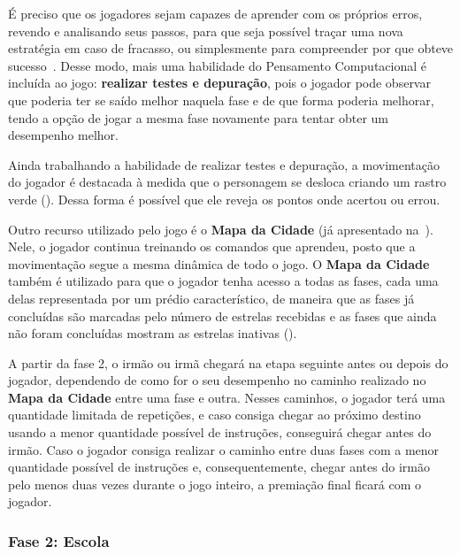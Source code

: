 É preciso que os jogadores sejam capazes de aprender com os próprios erros, revendo e analisando seus passos, para que seja possível traçar uma nova estratégia em caso de fracasso, ou simplesmente para compreender por que obteve sucesso~\cite{paula_jogos_2016}. Desse modo, mais uma habilidade do Pensamento Computacional é incluída ao jogo: \textbf{realizar testes e depuração}, pois o jogador pode observar que poderia ter se saído melhor naquela fase e de que forma poderia melhorar, tendo a opção de jogar a mesma fase novamente para tentar obter um desempenho melhor.

Ainda trabalhando a habilidade de realizar testes e depuração, a movimentação do jogador é destacada à medida que o personagem se desloca criando um rastro verde (). Dessa forma é possível que ele reveja os pontos onde acertou ou errou.


Outro recurso utilizado pelo jogo é o  \textbf{Mapa da Cidade} (já apresentado na~). Nele, o jogador continua treinando os comandos que aprendeu, posto que a movimentação segue a mesma dinâmica de todo o jogo. O  \textbf{Mapa da Cidade} também é utilizado para que o jogador tenha acesso a todas as fases, cada uma delas representada por um prédio característico, de maneira que as fases já concluídas são marcadas pelo número de estrelas recebidas e as fases que ainda não foram concluídas mostram as estrelas inativas ().


A partir da fase 2, o irmão ou irmã chegará na etapa seguinte antes ou depois do jogador, dependendo de como for o seu desempenho no caminho realizado no \textbf{Mapa da Cidade} entre uma fase e outra. Nesses caminhos, o jogador terá uma quantidade limitada de repetições, e caso consiga chegar ao próximo destino usando a menor quantidade possível de instruções,  conseguirá chegar antes do irmão. Caso o jogador consiga realizar o caminho entre duas fases com a menor quantidade possível de instruções e, consequentemente, chegar antes do irmão pelo menos duas vezes durante o jogo inteiro, a premiação final ficará com o jogador. 

\subsubsection{Fase 2: Escola} \label{sssec:fase_2}

